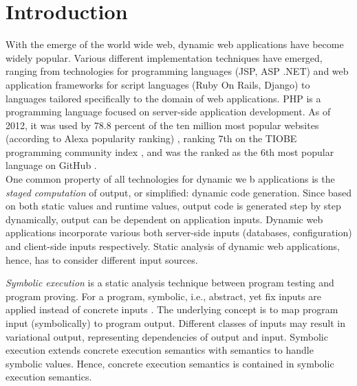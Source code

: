 \documentclass[preprint]{sig-alternate-05-2015}
\begin{document}



%
%
\printccsdesc



\section{Introduction}
With the emerge of the world wide web, dynamic web applications have become
widely popular. Various different implementation techniques have emerged,
ranging from technologies for programming languages (JSP, ASP .NET) and web
application frameworks for  script languages (Ruby On Rails, Django) to
languages tailored specifically to the domain of web applications. PHP \cite{phpNET} is
a programming language focused on server-side application development. As of 2012,
it was used by 78.8 percent of the ten million most popular websites (according
to Alexa popularity ranking) \cite{alexaPHP}, ranking 7th on the TIOBE
programming community index \cite{tiobePHP}, and was the ranked as the 6th most
popular language on GitHub \cite{githubPHP}.\\

One common property of all technologies for dynamic we b applications is the
\emph{staged computation} of output, or simplified: dynamic code generation.
Since based on both static values and runtime values, output code is generated step by step
dynamically, output can be dependent on application inputs. Dynamic web
applications incorporate various both server-side inputs (databases,
configuration) and client-side inputs respectively. Static
analysis of dynamic web applications, hence, has to consider different input
sources.

\emph{Symbolic execution} is a static analysis technique between program testing
and program proving. For a program, symbolic, i.e., abstract, yet fix inputs are
applied instead of concrete inputs \cite{Darringer1978,King1976}. The underlying
concept is to map program input (symbolically) to program output. Different classes of inputs may
result in variational output, representing dependencies of output and input.
Symbolic execution extends concrete execution semantics with semantics to
handle symbolic values. Hence, concrete execution semantics is contained in
symbolic execution semantics.\\
\end{document}
